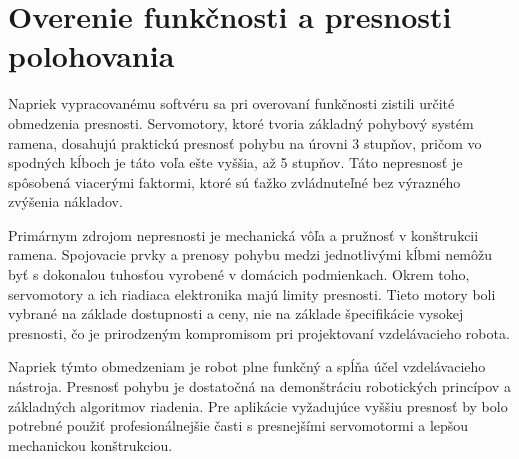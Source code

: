 \section{Overenie funkčnosti a presnosti polohovania}
Napriek vypracovanému softvéru sa pri overovaní funkčnosti zistili určité obmedzenia presnosti. Servomotory, ktoré tvoria základný pohybový systém ramena, dosahujú praktickú presnosť pohybu na úrovni 3 stupňov, pričom vo spodných kĺboch je táto voľa ešte vyššia, až 5 stupňov. Táto nepresnosť je spôsobená viacerými faktormi, ktoré sú ťažko zvládnuteľné bez výrazného zvýšenia nákladov.

Primárnym zdrojom nepresnosti je mechanická vôľa a pružnosť v konštrukcii ramena. Spojovacie prvky a prenosy pohybu medzi jednotlivými kĺbmi nemôžu byť s dokonalou tuhosťou vyrobené v domácich podmienkach. Okrem toho, servomotory a ich riadiaca elektronika majú limity presnosti. Tieto motory boli vybrané na základe dostupnosti a ceny, nie na základe špecifikácie vysokej presnosti, čo je prirodzeným kompromisom pri projektovaní vzdelávacieho robota.

Napriek týmto obmedzeniam je robot plne funkčný a spĺňa účel vzdelávacieho nástroja. Presnosť pohybu je dostatočná na demonštráciu robotických princípov a základných algoritmov riadenia. Pre aplikácie vyžadujúce vyššiu presnosť by bolo potrebné použiť profesionálnejšie časti s presnejšími servomotormi a lepšou mechanickou konštrukciou.